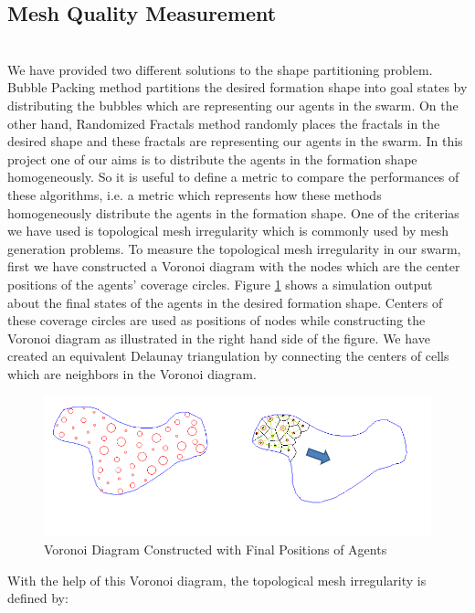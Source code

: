 \subsection{Mesh Quality Measurement}\hspace{0pt} \label{mesh_quality_ref}  \\
We have provided two different solutions to the shape partitioning problem. Bubble Packing method partitions the desired formation shape into goal states by distributing the bubbles which are representing our agents in the swarm. On the other hand, Randomized Fractals method randomly places the fractals in the desired shape and these fractals are representing our agents in the swarm. In this project one of our aims is to distribute the agents in the formation shape homogeneously. So it is useful to define a metric to compare the performances of these algorithms, i.e. a metric which represents how these methods homogeneously distribute the agents in the formation shape. One of the criterias we have used is topological mesh irregularity \cite{27} which is commonly used by mesh generation problems. To measure the topological mesh irregularity in our swarm, first we have constructed a Voronoi diagram with the nodes which are the center positions of the agents' coverage circles. Figure \ref{voronoi_voronoi} shows a simulation output about the final states of the agents in the desired formation shape. Centers of these coverage circles are used as positions of nodes while constructing the Voronoi diagram as illustrated in the right hand side of the figure. We have created an equivalent Delaunay triangulation by connecting the centers of cells which are neighbors in the Voronoi diagram.

\begin{figure}[H]
\caption{Voronoi Diagram Constructed with Final Positions of Agents} \label{voronoi_voronoi}
\centering
\includegraphics[scale = 0.70]{Artificial_Forces_Mesh_1}
\end{figure}

With the help of this Voronoi diagram, the topological mesh irregularity is defined by:

